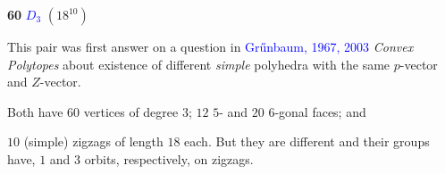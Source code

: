 \documentclass{beamer}
\begin{document}
\begin{frame}
\begin{center}
\begin{minipage}{4.4cm}
\par
{\bf 60} \textcolor{blue}{$D_3$}  $(18^{10})$
\end{minipage}
\end{center}
This pair was first answer on a question in  \textcolor{blue}{Gr\H{u}nbaum, 
1967, 2003}
{\em Convex Polytopes} about existence of different {\em simple}
polyhedra with the same $p$-vector and $Z$-vector.

Both have $60$ vertices of degree $3$;   $12$ $5$- and $20$ $6$-gonal 
faces; and

$10$ (simple) zigzags of length $18$ each.
But they are different and their groups have, $1$ and $3$ orbits,
respectively, on zigzags.
\end{frame}
\end{document}
